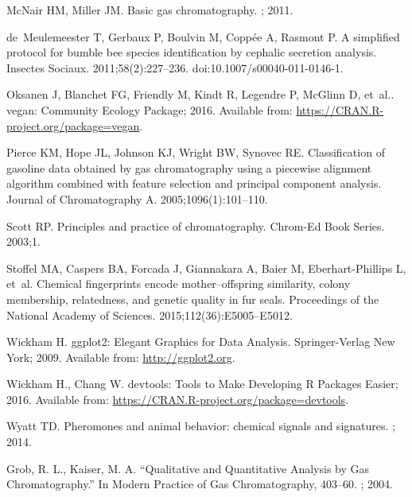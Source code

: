 \documentclass[10pt,letterpaper]{article}
\begin{document}
\begin{thebibliography}{10}
McNair HM, Miller JM.
\newblock Basic gas chromatography.
; 2011.

de~Meulemeester T, Gerbaux P, Boulvin M, Copp{\'e}e A, Rasmont P.
\newblock A simplified protocol for bumble bee species identification by
  cephalic secretion analysis.
\newblock Insectes Sociaux. 2011;58(2):227--236.
\newblock doi:{10.1007/s00040-011-0146-1}.

Oksanen J, Blanchet FG, Friendly M, Kindt R, Legendre P, McGlinn D, et~al..
  vegan: Community Ecology Package; 2016.
\newblock Available from: \url{https://CRAN.R-project.org/package=vegan}.

Pierce KM, Hope JL, Johnson KJ, Wright BW, Synovec RE.
\newblock Classification of gasoline data obtained by gas chromatography using
  a piecewise alignment algorithm combined with feature selection and principal
  component analysis.
\newblock Journal of Chromatography A. 2005;1096(1):101--110.

Scott RP.
\newblock Principles and practice of chromatography.
\newblock Chrom-Ed Book Series. 2003;1.

Stoffel MA, Caspers BA, Forcada J, Giannakara A, Baier M, Eberhart-Phillips L,
  et~al.
\newblock Chemical fingerprints encode mother--offspring similarity, colony
  membership, relatedness, and genetic quality in fur seals.
\newblock Proceedings of the National Academy of Sciences.
  2015;112(36):E5005--E5012.

Wickham H.
\newblock ggplot2: Elegant Graphics for Data Analysis.
\newblock Springer-Verlag New York; 2009.
\newblock Available from: \url{http://ggplot2.org}.


Wickham H., Chang W. devtools: Tools to Make Developing R Packages Easier; 2016.
\newblock Available from: \url{https://CRAN.R-project.org/package=devtools}.

Wyatt TD.
\newblock Pheromones and animal behavior: chemical signals and signatures.
; 2014.

Grob, R. L., Kaiser, M. A.
\newblock “Qualitative and Quantitative Analysis by Gas Chromatography.” In Modern Practice of Gas Chromatography, 403–60.
; 2004.

\end{thebibliography}
\end{document}
